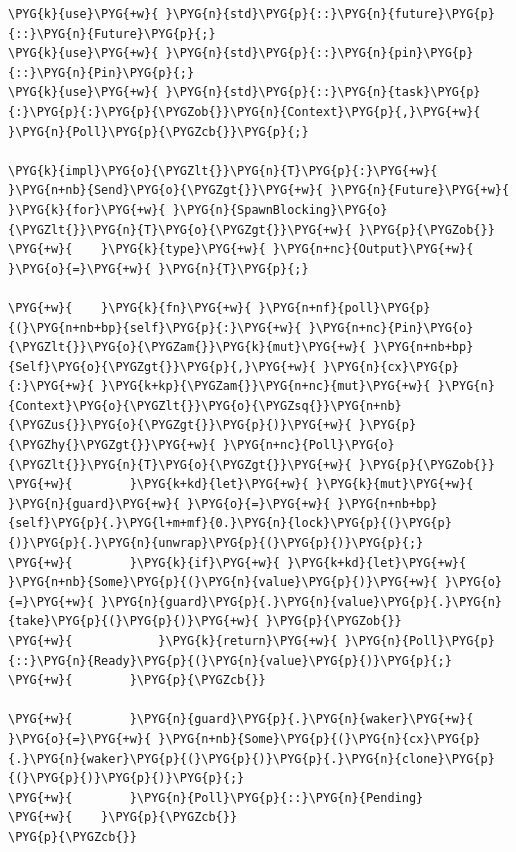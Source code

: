 \begin{Verbatim}[commandchars=\\\{\},breaklines=true,breakanywhere=true,fontsize=\codefont,xleftmargin=17bp]
\PYG{k}{use}\PYG{+w}{ }\PYG{n}{std}\PYG{p}{::}\PYG{n}{future}\PYG{p}{::}\PYG{n}{Future}\PYG{p}{;}
\PYG{k}{use}\PYG{+w}{ }\PYG{n}{std}\PYG{p}{::}\PYG{n}{pin}\PYG{p}{::}\PYG{n}{Pin}\PYG{p}{;}
\PYG{k}{use}\PYG{+w}{ }\PYG{n}{std}\PYG{p}{::}\PYG{n}{task}\PYG{p}{:}\PYG{p}{:}\PYG{p}{\PYGZob{}}\PYG{n}{Context}\PYG{p}{,}\PYG{+w}{ }\PYG{n}{Poll}\PYG{p}{\PYGZcb{}}\PYG{p}{;}

\PYG{k}{impl}\PYG{o}{\PYGZlt{}}\PYG{n}{T}\PYG{p}{:}\PYG{+w}{ }\PYG{n+nb}{Send}\PYG{o}{\PYGZgt{}}\PYG{+w}{ }\PYG{n}{Future}\PYG{+w}{ }\PYG{k}{for}\PYG{+w}{ }\PYG{n}{SpawnBlocking}\PYG{o}{\PYGZlt{}}\PYG{n}{T}\PYG{o}{\PYGZgt{}}\PYG{+w}{ }\PYG{p}{\PYGZob{}}
\PYG{+w}{    }\PYG{k}{type}\PYG{+w}{ }\PYG{n+nc}{Output}\PYG{+w}{ }\PYG{o}{=}\PYG{+w}{ }\PYG{n}{T}\PYG{p}{;}

\PYG{+w}{    }\PYG{k}{fn}\PYG{+w}{ }\PYG{n+nf}{poll}\PYG{p}{(}\PYG{n+nb+bp}{self}\PYG{p}{:}\PYG{+w}{ }\PYG{n+nc}{Pin}\PYG{o}{\PYGZlt{}}\PYG{o}{\PYGZam{}}\PYG{k}{mut}\PYG{+w}{ }\PYG{n+nb+bp}{Self}\PYG{o}{\PYGZgt{}}\PYG{p}{,}\PYG{+w}{ }\PYG{n}{cx}\PYG{p}{:}\PYG{+w}{ }\PYG{k+kp}{\PYGZam{}}\PYG{n+nc}{mut}\PYG{+w}{ }\PYG{n}{Context}\PYG{o}{\PYGZlt{}}\PYG{o}{\PYGZsq{}}\PYG{n+nb}{\PYGZus{}}\PYG{o}{\PYGZgt{}}\PYG{p}{)}\PYG{+w}{ }\PYG{p}{\PYGZhy{}\PYGZgt{}}\PYG{+w}{ }\PYG{n+nc}{Poll}\PYG{o}{\PYGZlt{}}\PYG{n}{T}\PYG{o}{\PYGZgt{}}\PYG{+w}{ }\PYG{p}{\PYGZob{}}
\PYG{+w}{        }\PYG{k+kd}{let}\PYG{+w}{ }\PYG{k}{mut}\PYG{+w}{ }\PYG{n}{guard}\PYG{+w}{ }\PYG{o}{=}\PYG{+w}{ }\PYG{n+nb+bp}{self}\PYG{p}{.}\PYG{l+m+mf}{0.}\PYG{n}{lock}\PYG{p}{(}\PYG{p}{)}\PYG{p}{.}\PYG{n}{unwrap}\PYG{p}{(}\PYG{p}{)}\PYG{p}{;}
\PYG{+w}{        }\PYG{k}{if}\PYG{+w}{ }\PYG{k+kd}{let}\PYG{+w}{ }\PYG{n+nb}{Some}\PYG{p}{(}\PYG{n}{value}\PYG{p}{)}\PYG{+w}{ }\PYG{o}{=}\PYG{+w}{ }\PYG{n}{guard}\PYG{p}{.}\PYG{n}{value}\PYG{p}{.}\PYG{n}{take}\PYG{p}{(}\PYG{p}{)}\PYG{+w}{ }\PYG{p}{\PYGZob{}}
\PYG{+w}{            }\PYG{k}{return}\PYG{+w}{ }\PYG{n}{Poll}\PYG{p}{::}\PYG{n}{Ready}\PYG{p}{(}\PYG{n}{value}\PYG{p}{)}\PYG{p}{;}
\PYG{+w}{        }\PYG{p}{\PYGZcb{}}

\PYG{+w}{        }\PYG{n}{guard}\PYG{p}{.}\PYG{n}{waker}\PYG{+w}{ }\PYG{o}{=}\PYG{+w}{ }\PYG{n+nb}{Some}\PYG{p}{(}\PYG{n}{cx}\PYG{p}{.}\PYG{n}{waker}\PYG{p}{(}\PYG{p}{)}\PYG{p}{.}\PYG{n}{clone}\PYG{p}{(}\PYG{p}{)}\PYG{p}{)}\PYG{p}{;}
\PYG{+w}{        }\PYG{n}{Poll}\PYG{p}{::}\PYG{n}{Pending}
\PYG{+w}{    }\PYG{p}{\PYGZcb{}}
\PYG{p}{\PYGZcb{}}
\end{Verbatim}

